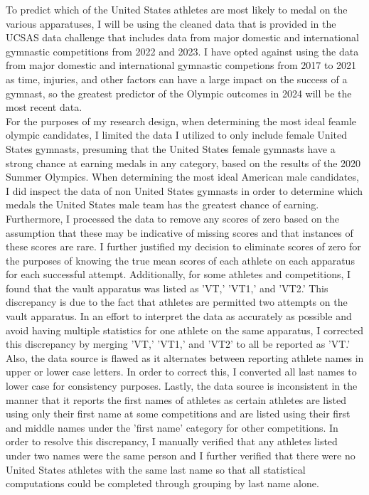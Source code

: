 \documentclass[12pt]{article}
\begin{document}
To predict which of the United States athletes are most likely to medal on the various apparatuses, 
I will be using the cleaned data that 
is provided in the UCSAS data challenge that includes data from major domestic and international 
gymnastic competitions from 2022 and 2023. I have opted against using the data from major domestic
and international gymnastic competions from 2017 to 2021 as time, injuries, 
and other factors can have a large impact on the success of a gymnast, so the greatest predictor
of the Olympic outcomes in 2024 will be the most recent data.
\\
For the purposes of my research design, when determining the most ideal feamle olympic candidates, 
I limited the data I utilized to only include female United States
gymnasts, presuming that the United States female gymnasts have a strong chance at earning medals in any category, 
based on the results of the 2020 Summer Olympics. When determining the most ideal American male candidates, 
I did inspect the data of non United States gymnasts in order to determine which medals the United States 
male team has the greatest chance of earning. 
Furthermore, I processed the data to remove any scores of zero based on the assumption that these may 
be indicative of missing scores and that instances of these scores are rare. I further justified my decision 
to eliminate scores of zero for the purposes of knowing the true mean scores of each athlete on each 
apparatus for each successful attempt. Additionally, for some athletes and competitions, I found that the vault
apparatus was listed as 'VT,' 'VT1,' and 'VT2.' This discrepancy is due to the fact that athletes are permitted
two attempts on the vault apparatus. In an effort to interpret the data as accurately as possible and avoid having 
multiple statistics for one athlete on the same apparatus, I corrected this discrepancy by merging 'VT,' 'VT1,' and 
'VT2' to all be reported as 'VT.' Also, the data source is flawed as it alternates between reporting athlete names
in upper or lower case letters. In order to correct this, I converted all last names to lower case for consistency 
purposes. Lastly, the data source is inconsistent in the manner that it reports the first names of athletes as certain
athletes are listed using only their first name at some competitions and are listed using their first and middle names 
under the 'first name' category for other competitions. In order to resolve this discrepancy, I manually verified that 
any athletes listed under two names were the same person and I further verified that there were no United States  
athletes with the same last name so that all statistical computations could be completed through grouping by last 
name alone.
\end{document}
